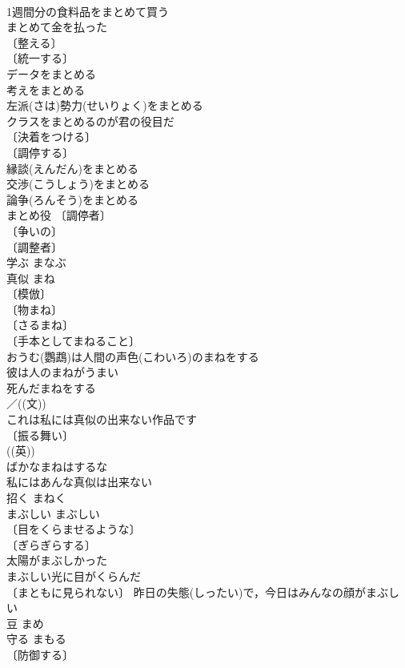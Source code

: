 \documentclass[8pt]{extreport}
\begin{document}
\begin{CJK}{UTF8}{min}
\\	1週間分の食料品をまとめて買う 
\\	まとめて金を払った 
\\	〔整える〕
\\	〔統一する〕
\\	データをまとめる 
\\	考えをまとめる 
\\	左派(さは)勢力(せいりょく)をまとめる 
\\	クラスをまとめるのが君の役目だ 
\\	〔決着をつける〕
\\	〔調停する〕
\\	縁談(えんだん)をまとめる 
\\	交渉(こうしょう)をまとめる 
\\	論争(ろんそう)をまとめる 
\\	まとめ役 〔調停者〕
\\	〔争いの〕
\\	〔調整者〕
\\	学ぶ	まなぶ	
\\	真似	まね	
\\	〔模倣〕
\\	〔物まね〕
\\	〔さるまね〕
\\	〔手本としてまねること〕
\\	おうむ(鸚鵡)は人間の声色(こわいろ)のまねをする 
\\	彼は人のまねがうまい 
\\	死んだまねをする 
\\	／((文))
\\	これは私には真似の出来ない作品です 
\\	〔振る舞い〕
\\	((英)) 
\\	ばかなまねはするな 
\\	私にはあんな真似は出来ない 
\\	招く	まねく	
\\	まぶしい	まぶしい	
\\	〔目をくらませるような〕
\\	〔ぎらぎらする〕
\\	太陽がまぶしかった 
\\	まぶしい光に目がくらんだ 
\\	〔まともに見られない〕 昨日の失態(しったい)で，今日はみんなの顔がまぶしい 
\\	豆	まめ	
\\	守る	まもる	
\\	〔防御する〕

\end{CJK}
\end{document}
